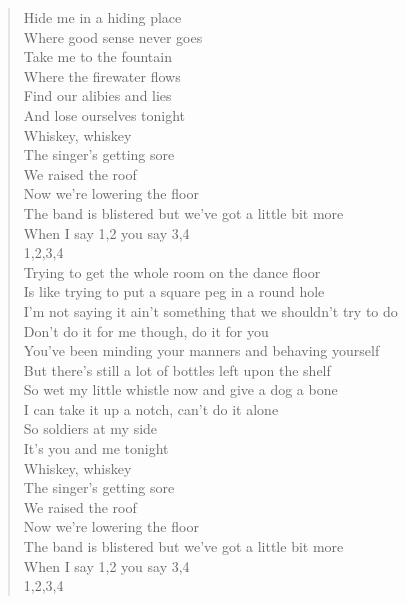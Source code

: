 \documentclass[11pt]{article}
\begin{document}
\begin{verse}
Hide me in a hiding place\\
Where good sense never goes\\
Take me to the fountain\\
Where the firewater flows\\
Find our alibies and lies\\
And lose ourselves tonight\\
\vspace*{1em}
Whiskey, whiskey\\
The singer’s getting sore\\
We raised the roof\\
Now we’re lowering the floor\\
The band is blistered but we’ve got a little bit more\\
When I say 1,2 you say 3,4\\
1,2,3,4\\
Trying to get the whole room on the dance floor\\
Is like trying to put a square peg in a round hole\\
I’m not saying it ain’t something that we shouldn’t try to do\\
Don’t do it for me though, do it for you\\
You’ve been minding your manners and behaving yourself\\
But there’s still a lot of bottles left upon the shelf\\
So wet my little whistle now and give a dog a bone\\
I can take it up a notch, can’t do it alone\\
So soldiers at my side\\
It’s you and me tonight\\
\vspace*{1em}
Whiskey, whiskey\\
The singer’s getting sore\\
We raised the roof\\
Now we’re lowering the floor\\
The band is blistered but we’ve got a little bit more\\
When I say 1,2 you say 3,4\\
1,2,3,4\\
\end{verse}
\clearpage
\end{document}

